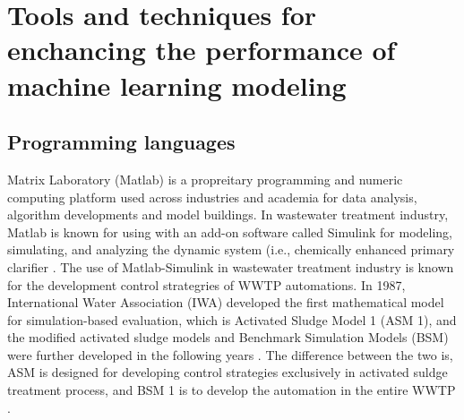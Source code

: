 \citep{kehreinCriticalReviewResource2020}

\section{Tools and techniques for enchancing the performance of machine learning modeling}
\subsection{Programming languages}

Matrix Laboratory (Matlab) is a propreitary programming and numeric computing platform used across industries and academia for data analysis, algorithm developments and model buildings. In wastewater treatment industry, Matlab is known for using with an add-on software called Simulink for modeling, simulating, and analyzing the dynamic system (i.e., chemically enhanced primary clarifier \citep{bachisModellingCharacterizationPrimary2015}. The use of Matlab-Simulink in wastewater treatment industry is known for the development control strategries of WWTP automations. In 1987, International Water Association (IWA) developed the first mathematical model for simulation-based evaluation, which is Activated Sludge Model 1 (ASM 1), and the modified activated sludge models and Benchmark Simulation Models (BSM) were further developed in the following years \citep{talibModelingControlWastewater2011}. The difference between the two is, ASM is designed for developing control strategies exclusively in activated suldge treatment process, and BSM 1 is to develop the automation in the entire WWTP \citep{ballhysaWastewaterTreatmentPlant2020}.
 
